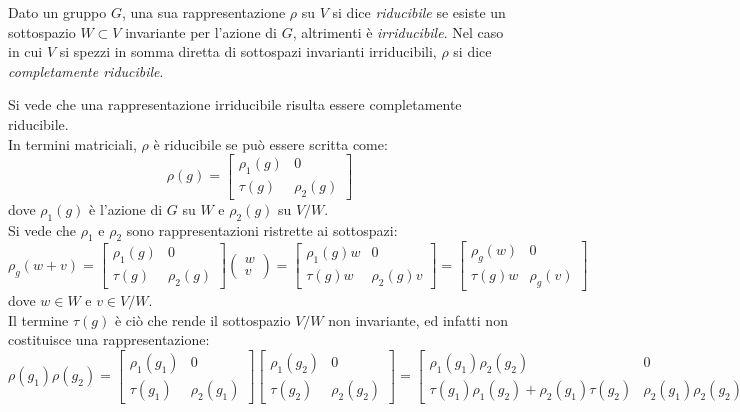 \begin{definition}
	Dato un gruppo $ G $, una sua rappresentazione $ \rho $ su $ V $ si dice \textit{riducibile} se esiste un sottospazio $ W \subset V $ invariante per l'azione di $ G $, altrimenti è \textit{irriducibile}. Nel caso in cui $ V $ si spezzi in somma diretta di sottospazi invarianti irriducibili, $ \rho $ si dice \textit{completamente riducibile}.
\end{definition}

Si vede che una rappresentazione irriducibile risulta essere completamente riducibile.\\
In termini matriciali, $ \rho $ è riducibile se può essere scritta come:
\begin{equation}
	\rho(g) =
	\begin{bmatrix}
		\rho_1(g) & 0 \\
		\tau(g) & \rho_2(g)
	\end{bmatrix}
	\label{eq:8.2}
\end{equation}
dove $ \rho_1(g) $ è l'azione di $ G $ su $ W $ e $ \rho_2(g) $ su $ V/W $.\\
Si vede che $ \rho_1 $ e $ \rho_2 $ sono rappresentazioni ristrette ai sottospazi:
\begin{equation*}
	\rho_g(w + v) =
	\begin{bmatrix}
		\rho_1(g) & 0 \\
		\tau(g) & \rho_2(g)
	\end{bmatrix}
	\begin{pmatrix}
		w \\ v
	\end{pmatrix}
	=
	\begin{bmatrix}
		\rho_1(g) w & 0 \\
		\tau(g) w & \rho_2(g) v
	\end{bmatrix}
	=
	\begin{bmatrix}
		\rho_g(w) & 0 \\
		\tau(g) w & \rho_g(v)
	\end{bmatrix}
\end{equation*}
dove $ w \in W $ e $ v \in V/W $.\\
Il termine $ \tau(g) $ è ciò che rende il sottospazio $ V/W $ non invariante, ed infatti non costituisce una rappresentazione:
\begin{equation*}
	\rho(g_1) \rho(g_2) =
	\begin{bmatrix}
		\rho_1(g_1) & 0 \\
		\tau(g_1) & \rho_2(g_1)
	\end{bmatrix}
	\begin{bmatrix}
		\rho_1(g_2) & 0 \\
		\tau(g_2) & \rho_2(g_2)
	\end{bmatrix}
	=
	\begin{bmatrix}
		\rho_1(g_1) \rho_2(g_2) & 0 \\
		\tau(g_1) \rho_1(g_2) + \rho_2(g_1) \tau(g_2) & \rho_2(g_1) \rho_2(g_2)
	\end{bmatrix}
\end{equation*}
